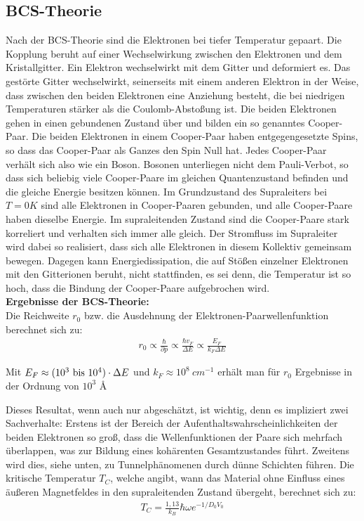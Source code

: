 \documentclass[12pt]{article}
\begin{document}
\subsection{BCS-Theorie}
\label{bcs}
Nach der BCS-Theorie sind die Elektronen bei tiefer Temperatur gepaart. Die Kopplung beruht auf einer Wechselwirkung zwischen den Elektronen und dem Kristallgitter. Ein Elektron wechselwirkt mit dem Gitter und deformiert es. Das gestörte Gitter wechselwirkt, seinerseits mit einem anderen Elektron in der Weise, dass zwischen den beiden Elektronen eine Anziehung besteht, die bei niedrigen Temperaturen stärker als die Coulomb-Abstoßung ist. Die beiden Elektronen gehen in einen gebundenen Zustand über und bilden ein so genanntes Cooper-Paar. Die beiden Elektronen in einem Cooper-Paar haben entgegengesetzte Spins, so dass das Cooper-Paar als Ganzes den Spin Null hat. Jedes Cooper-Paar verhält sich also wie ein Boson. Bosonen unterliegen nicht dem Pauli-Verbot, so dass sich beliebig viele Cooper-Paare im gleichen Quantenzustand befinden und die gleiche Energie besitzen können. Im Grundzustand des Supraleiters bei $T = 0K$ sind alle Elektronen in Cooper-Paaren gebunden, und alle Cooper-Paare haben dieselbe Energie. Im supraleitenden Zustand sind die Cooper-Paare stark korreliert und verhalten sich immer alle gleich. Der Stromfluss im Supraleiter wird dabei so realisiert, dass sich alle Elektronen in diesem Kollektiv gemeinsam bewegen. Dagegen kann Energiedissipation, die auf Stößen einzelner Elektronen mit den Gitterionen beruht, nicht stattfinden, es sei denn, die Temperatur ist so hoch, dass die Bindung der Cooper-Paare aufgebrochen wird. \\

\textbf{Ergebnisse der BCS-Theorie:} \\

Die Reichweite $r_0$ bzw. die Ausdehnung der Elektronen-Paarwellenfunktion berechnet sich zu:
\begin{align}
r_0 \propto \frac{\hbar}{\partial p} \propto \frac{\hbar v_F}{\Delta E} \propto \frac{E_F}{k_F \Delta E}
\end{align}

Mit $E_F \approx (10^3 ~\textnormal{bis}~ 10^4) \cdot \Delta E$ und $k_F \approx 10^8~ cm^{-1}$ erhält man für $r_0$ Ergebnisse in der Ordnung von $10^3$ \AA

Dieses Resultat, wenn auch nur abgeschätzt, ist wichtig, denn es impliziert zwei Sachverhalte: Erstens
ist der Bereich der Aufenthaltswahrscheinlichkeiten der beiden Elektronen so groß, dass die Wellenfunktionen der Paare sich mehrfach überlappen, was zur Bildung eines kohärenten Gesamtzustandes führt.
Zweitens wird dies, siehe unten, zu Tunnelphänomenen durch dünne Schichten führen.
Die kritische Temperatur $T_C$, welche angibt, wann das Material ohne Einfluss eines äußeren Magnetfeldes 
in den supraleitenden Zustand übergeht, berechnet sich zu:
\begin{align}
 T_C = \frac{1,13}{k_B} \hbar \omega e^{-1/D_0 V_0}
\end{align}
\end{document}
